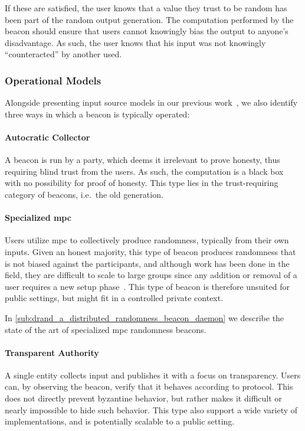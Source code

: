 If these are satisfied, the user knows that a value they trust to be random has been part of the random output generation.
The computation performed by the beacon should ensure that users cannot knowingly bias the output to anyone's disadvantage.
As such, the user knows that his input was not knowingly \enquote{counteracted} by another used.

\subsubsection{Operational Models}
Alongside presenting input source models in our previous work~\cite{worldsbestpaper}, we also identify three ways in which a beacon is typically operated:

\paragraph{Autocratic Collector}
A beacon is run by a party, which deems it irrelevant to prove honesty, thus requiring blind trust from the users.
As such, the computation is a black box with no possibility for proof of honesty.
This type lies in the trust-requiring category of beacons, i.e.\ the old generation.

\paragraph{Specialized \acrshort{mpc}}
Users utilize \acrfull{mpc} to collectively produce randomness, typically from their own inputs.
Given an honest majority, this type of beacon produces randomness that is not biased against the participants, and although work has been done in the field, they are difficult to scale to large groups since any addition or removal of a user requires a new setup phase~\cite{cascudo2017scrape, syta2017scalable}.
This type of beacon is therefore unsuited for public settings, but might fit in a controlled private context.

In \cref{sub:drand_a_distributed_randomness_beacon_daemon} we describe the state of the art of specialized \gls{mpc} randomness beacons.

\paragraph{Transparent Authority}
A single entity collects input and publishes it with a focus on transparency.
Users can, by observing the beacon, verify that it behaves according to protocol.
This does not directly prevent byzantine behavior, but rather makes it difficult or nearly impossible to hide such behavior.
This type also support a wide variety of implementations, and is potentially scalable to a public setting.
